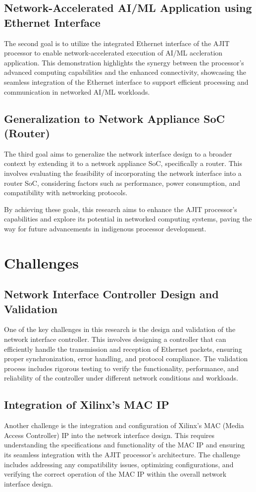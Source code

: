 \documentclass[12pt]{report}
\begin{document}
		\subsection{Network-Accelerated AI/ML Application using Ethernet Interface}
			The second goal is to utilize the integrated Ethernet interface of the AJIT processor to enable network-accelerated execution of AI/ML accleration application. This demonstration highlights the synergy between the processor's advanced computing capabilities and the enhanced connectivity, showcasing the seamless integration of the Ethernet interface to support efficient processing and communication in networked AI/ML workloads.

		\subsection{Generalization to Network Appliance SoC (Router)}
			The third goal aims to generalize the network interface design to a broader context by extending it to a network appliance SoC, specifically a router. This involves evaluating the feasibility of incorporating the network interface into a router SoC, considering factors such as performance, power consumption, and compatibility with networking protocols.

By achieving these goals, this research aims to enhance the AJIT processor's capabilities and explore its potential in networked computing systems, paving the way for future advancements in indigenous processor development.

	\section{Challenges}

		\subsection{Network Interface Controller Design and Validation}
   One of the key challenges in this research is the design and validation of the network interface controller. This involves designing a controller that can efficiently handle the transmission and reception of Ethernet packets, ensuring proper synchronization, error handling, and protocol compliance. The validation process includes rigorous testing to verify the functionality, performance, and reliability of the controller under different network conditions and workloads.

		\subsection{Integration of Xilinx's MAC IP}
   Another challenge is the integration and configuration of Xilinx's MAC (Media Access Controller) IP into the network interface design. This requires understanding the specifications and functionality of the MAC IP and ensuring its seamless integration with the AJIT processor's architecture. The challenge includes addressing any compatibility issues, optimizing configurations, and verifying the correct operation of the MAC IP within the overall network interface design.
\end{document}
